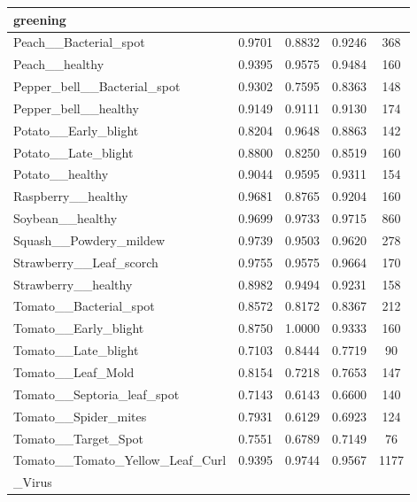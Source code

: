 \documentclass[conference]{IEEEtran}
\begin{document}
\begin{table}[ht]
\begin{adjustbox}{max width=\textwidth}
\begin{tabular}{|p{4.5cm}|c|c|c|c|}
        greening &  &  &  & \\
        \hline
        Peach\_\_Bacterial\_spot & 0.9701 & 0.8832 & 0.9246 & 368 \\
        \hline
        Peach\_\_healthy & 0.9395 & 0.9575 & 0.9484 & 160 \\
        \hline
        Pepper\_bell\_\_Bacterial\_spot & 0.9302 & 0.7595 & 0.8363 & 148 \\
        \hline
        Pepper\_bell\_\_healthy & 0.9149 & 0.9111 & 0.9130 & 174 \\
        \hline
        Potato\_\_Early\_blight & 0.8204 & 0.9648 & 0.8863 & 142 \\
        \hline
        Potato\_\_Late\_blight & 0.8800 & 0.8250 & 0.8519 & 160 \\
        \hline
        Potato\_\_healthy & 0.9044 & 0.9595 & 0.9311 & 154 \\
        \hline
        Raspberry\_\_healthy & 0.9681 & 0.8765 & 0.9204 & 160 \\
        \hline
        Soybean\_\_healthy & 0.9699 & 0.9733 & 0.9715 & 860 \\
        \hline
        Squash\_\_Powdery\_mildew & 0.9739 & 0.9503 & 0.9620 & 278 \\
        \hline
        Strawberry\_\_Leaf\_scorch & 0.9755 & 0.9575 & 0.9664 & 170 \\
        \hline
        Strawberry\_\_healthy & 0.8982 & 0.9494 & 0.9231 & 158 \\
        \hline
        Tomato\_\_Bacterial\_spot & 0.8572 & 0.8172 & 0.8367 & 212 \\
        \hline
        Tomato\_\_Early\_blight & 0.8750 & 1.0000 & 0.9333 & 160 \\
        \hline
        Tomato\_\_Late\_blight & 0.7103 & 0.8444 & 0.7719 & 90 \\
        \hline
        Tomato\_\_Leaf\_Mold & 0.8154 & 0.7218 & 0.7653 & 147 \\
        \hline
        Tomato\_\_Septoria\_leaf\_spot & 0.7143 & 0.6143 & 0.6600 & 140 \\
        \hline
        Tomato\_\_Spider\_mites & 0.7931 & 0.6129 & 0.6923 & 124 \\
        \hline
        Tomato\_\_Target\_Spot & 0.7551 & 0.6789 & 0.7149 & 76 \\
        \hline
        Tomato\_\_Tomato\_Yellow\_Leaf\_Curl & 0.9395 & 0.9744 & 0.9567 & 1177 \\
        \_Virus & & & & \\

\end{tabular}
\end{adjustbox}
\end{table}
\end{document}
